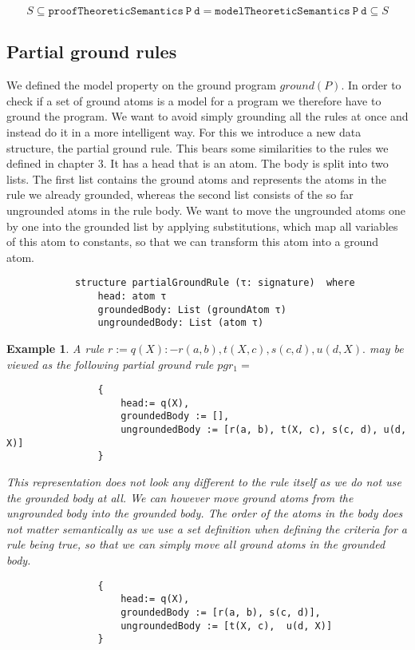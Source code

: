 \documentclass{article}
\newtheorem{example}{Example}
\begin{document}
    \[ S \subseteq \mathtt{proofTheoreticSemantics\ P\ d} = \mathtt{modelTheoreticSemantics\ P\ d} \subseteq S \]

    \subsection{Partial ground rules}
    
        We defined the model property on the ground program $ground(P)$. In order to check if a set of ground atoms is a model for a program we therefore have to ground the program. We want to avoid simply grounding all the rules at once and instead do it in a more intelligent way. For this we introduce a new data structure, the partial ground rule. This bears some similarities to the rules we defined in chapter 3. It has a head that is an atom. The body is split into two lists. The first list contains the ground atoms and represents the atoms in the rule we already grounded, whereas the second list consists of the so far ungrounded atoms in the rule body. We want to move the ungrounded atoms one by one into the grounded list by applying substitutions, which map all variables of this atom to constants, so that we can transform this atom into a ground atom.

        \begin{lstlisting}
            structure partialGroundRule (τ: signature)  where
                head: atom τ
                groundedBody: List (groundAtom τ)
                ungroundedBody: List (atom τ)
        \end{lstlisting}

        \begin{example}
            A rule $r := q(X) :- r(a, b), t(X, c), s(c, d), u(d, X) .$ may be viewed as the following partial ground rule
            $pgr_1 = $
            \begin{lstlisting}
                {
                    head:= q(X),
                    groundedBody := [],
                    ungroundedBody := [r(a, b), t(X, c), s(c, d), u(d, X)]
                }
            \end{lstlisting}
            
            This representation does not look any different to the rule itself as we do not use the grounded body at all. We can however move ground atoms from the ungrounded body into the grounded body. The order of the atoms in the body does not matter semantically as we use a set definition when defining the criteria for a rule being true, so that we can simply move all ground atoms in the grounded body.

            \begin{lstlisting}
                {
                    head:= q(X),
                    groundedBody := [r(a, b), s(c, d)],
                    ungroundedBody := [t(X, c),  u(d, X)]
                }
            \end{lstlisting}

        \end{example}
\end{document}
